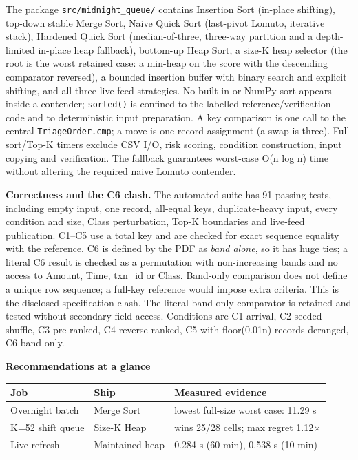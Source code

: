\documentclass[10pt,a4paper]{article}
\newcommand{\subheading}[1]{%
  \par\addvspace{3pt}%
  \noindent{\color{teal}\rule[-1.4pt]{2.6pt}{9pt}}\hspace{5pt}%
  {\fontsize{9.2}{11}\selectfont\bfseries #1}%
  \par\vspace{1pt}%
}
\begin{document}
The package \texttt{src/midnight\_\allowbreak{}queue/} contains Insertion Sort
(in-place shifting), top-down stable Merge Sort, Naive Quick Sort (last-pivot
Lomuto, iterative stack), Hardened Quick Sort (median-of-three, three-way
partition and a depth-limited in-place heap fallback), bottom-up Heap Sort, a
size-K heap selector (the root is the worst retained case: a min-heap on the
score with the descending comparator reversed), a bounded insertion buffer with
binary search and explicit shifting, and all three live-feed strategies. No
built-in or NumPy sort appears inside a contender; \texttt{sorted()} is
confined to the labelled reference/verification code and to deterministic input
preparation. A key comparison is one call to the central
\texttt{TriageOrder.cmp}; a move is one record assignment (a swap is three).
Full-sort/Top-K timers exclude CSV I/O, risk scoring, condition construction,
input copying and verification. The fallback guarantees worst-case O(n log n)
time without altering the required naive Lomuto contender.\par

\textbf{Correctness and the C6 clash.} The automated suite has 91 passing
tests, including empty input, one record, all-equal keys, duplicate-heavy
input, every condition and size, Class perturbation, Top-K boundaries and
live-feed publication. C1--C5 use a total key and are checked for exact
sequence equality with the reference. C6 is defined by the PDF as
\textit{band alone}, so it has huge ties; a literal C6 result is checked as a
permutation with non-increasing bands and no access to Amount, Time, txn\_id or
Class. Band-only comparison does not define a unique row sequence; a full-key
reference would impose extra criteria. This is the disclosed specification
clash. The literal band-only comparator is retained and tested without
secondary-field access. Conditions are C1 arrival, C2 seeded shuffle, C3
pre-ranked, C4 reverse-ranked, C5 with floor(0.01n) records deranged, C6
band-only.\par

\subheading{Recommendations at a glance}

{\fontsize{6.9}{8.3}\selectfont
\renewcommand{\arraystretch}{1.10}
\begin{tabularx}{\linewidth}{@{}L{0.55}L{0.62}L{1.83}@{}}
\toprule{}
\textbf{Job} & \textbf{Ship} & \textbf{Measured evidence} \\
\midrule
Overnight batch & Merge Sort & lowest full-size worst case: 11.29 s \\
K=52 shift queue & Size-K Heap & wins 25/28 cells; max regret 1.12$\times$ \\
Live refresh & Maintained heap & 0.284 s (60 min), 0.538 s (10 min) \\
\bottomrule
\end{tabularx}}\par\vspace{0.5pt}
\end{document}
